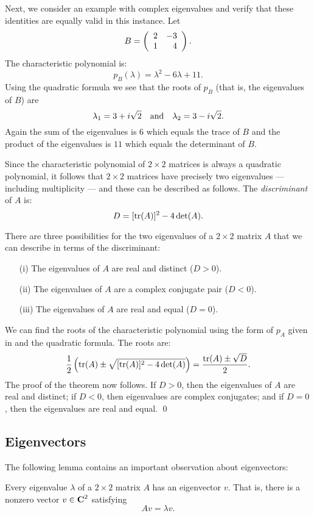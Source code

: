 Next, we consider an example with complex eigenvalues and verify that these 
identities are equally valid in this instance.  Let
\[
B = \left(\begin{array}{rr} 2 & -3\\ 1 &4\end{array}\right).
\]
The characteristic polynomial is:
\[
p_B(\lambda) = \lambda^2 -6\lambda + 11.
\]
Using the quadratic formula we see that the roots of $p_B$ (that
is, the eigenvalues of $B$) are
\[
\lambda_1 = 3 + i\sqrt{2} \quad\mbox{and}\quad \lambda_2 = 3 -i\sqrt{2}.
\]
Again the sum of the eigenvalues is $6$ which equals the trace
of $B$ and the product of the eigenvalues is $11$ which equals
the determinant of $B$.

Since the characteristic polynomial of $2\times 2$ matrices is
always a quadratic polynomial, it follows that $2\times 2$
matrices have precisely two eigenvalues --- including
multiplicity --- and these can be described as follows.  The
{\em discriminant\/} of $A$ is:
\begin{equation}  \label{e:discriminant}
D = [{\rm tr}(A)]^2 -4\det(A).
\end{equation}
\begin{thm} \label{eigendist}
There are three possibilities for the two eigenvalues of a
$2\times 2$ matrix $A$ that we can describe in terms of the
discriminant:
\begin{itemize}
\item[(i)] The eigenvalues of $A$ are real and distinct ($D>0$).
\item[(ii)] The eigenvalues of $A$ are a complex conjugate pair ($D<0$).
\item[(iii)] The eigenvalues of $A$ are real and equal ($D=0$).
\end{itemize}
\end{thm} 

\proof We can find the roots of the characteristic polynomial
using the form of $p_A$ given in  and the
quadratic formula.  The roots are:
\[
\frac{1}{2}\left({\rm tr}(A)\pm \sqrt{[{\rm tr}(A)]^2-4\det(A)}\right)
= \frac{{\rm tr}(A) \pm \sqrt{D}}{2}.
\]
The proof of the theorem now follows.  If $D>0$, then the
eigenvalues of $A$ are real and distinct; if $D<0$, then
eigenvalues are complex conjugates; and if $D=0$, then the
eigenvalues are real and equal.  \qed

\subsection*{Eigenvectors}

The following lemma contains an important observation about eigenvectors:
\begin{lemma} \label{L:eigenexists}
Every eigenvalue $\lambda$ of a $2\times 2$ matrix $A$ has an
eigenvector $v$.  That is, there is a nonzero vector $v\in\mbox{$\bf{C}$}^2$
satisfying
\[
Av = \lambda v.
\]
\end{lemma} 


